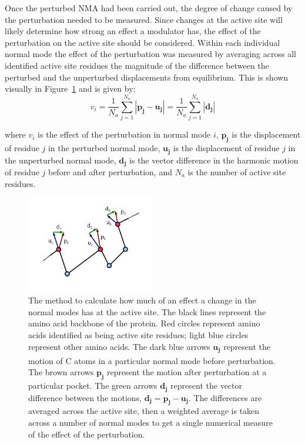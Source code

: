 Once the perturbed NMA had been carried out, the degree of change caused by the perturbation needed to be measured.
Since changes at the active site will likely determine how strong an effect a modulator has, the effect of the perturbation on the active site should be considered.
Within each individual normal mode the effect of the perturbation was measured by averaging across all identified active site residues the magnitude of the difference between the perturbed and the unperturbed displacements from equilibrium.
This is shown visually in Figure~\ref{fig:nma_difference} and is given by:
$$
v_{i} = \frac{1}{N_{a}} \sum_{j=1}^{N_{a}} \left | \mathbf{p_{j}} - \mathbf{u_{j}} \right | = \frac{1}{N_{a}} \sum_{j=1}^{N_{a}} \left | \mathbf{d_{j}} \right |
$$

where $v_{i}$ is the effect of the perturbation in normal mode $i$, $\mathbf{p_{j}}$ is the displacement of residue $j$ in the perturbed normal mode, $\mathbf{u_{j}}$ is the displacement of residue $j$ in the unperturbed normal mode, $\mathbf{d_{j}}$ is the vector difference in the harmonic motion of residue $j$ before and after perturbation, and $N_{a}$ is the number of active site residues.


\begin{figure}
\centering

\includegraphics[width=0.5\textwidth]{figures/nma_difference/nma_difference}

\caption[Method used by AlloPred to calculate how much of an effect a change in the normal modes has at the active site]
{The method to calculate how much of an effect a change in the normal modes has at the active site.
The black lines represent the amino acid backbone of the protein.
Red circles represent amino acids identified as being active site residues; light blue circles represent other amino acids.
The dark blue arrows $\mathbf{u_{j}}$ represent the motion of C\textsuperscript{\textalpha} atoms in a particular normal mode before perturbation.
The brown arrows $\mathbf{p_{j}}$ represent the motion after perturbation at a particular pocket.
The green arrows $\mathbf{d_{j}}$ represent the vector difference between the motions, $\mathbf{d_{j}} = \mathbf{p_{j}} - \mathbf{u_{j}}$.
The differences are averaged across the active site, then a weighted average is taken across a number of normal modes to get a single numerical measure of the effect of the perturbation.}

\label{fig:nma_difference}
\end{figure}


